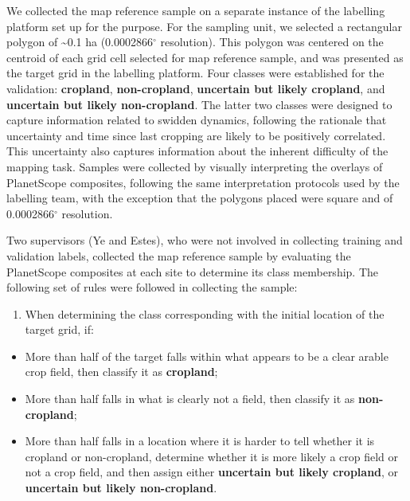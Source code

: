 \documentclass[
  11pt,
  a4paper]{article}
\providecommand{\tightlist}{%
  \setlength{\itemsep}{0pt}\setlength{\parskip}{0pt}}
\begin{document}
We collected the map reference sample on a separate instance of the
labelling platform set up for the purpose. For the sampling unit, we
selected a rectangular polygon of \textasciitilde0.1 ha
(0.0002866\(^\circ\) resolution). This polygon was centered on the
centroid of each grid cell selected for map reference sample, and was
presented as the target grid in the labelling platform. Four classes
were established for the validation: \textbf{cropland},
\textbf{non-cropland}, \textbf{uncertain but likely cropland}, and
\textbf{uncertain but likely non-cropland}. The latter two classes were
designed to capture information related to swidden dynamics, following
the rationale that uncertainty and time since last cropping are likely
to be positively correlated. This uncertainty also captures information
about the inherent difficulty of the mapping task. Samples were
collected by visually interpreting the overlays of PlanetScope
composites, following the same interpretation protocols used by the
labelling team, with the exception that the polygons placed were square
and of 0.0002866\(^\circ\) resolution.

Two supervisors (Ye and Estes), who were not involved in collecting
training and validation labels, collected the map reference sample by
evaluating the PlanetScope composites at each site to determine its
class membership. The following set of rules were followed in collecting
the sample:

\begin{enumerate}
\def\labelenumi{\arabic{enumi}.}
\tightlist
\item
  When determining the class corresponding with the initial location of
  the target grid, if:
\end{enumerate}

\begin{itemize}
\tightlist
\item
  More than half of the target falls within what appears to be a clear
  arable crop field, then classify it as \textbf{cropland};
\item
  More than half falls in what is clearly not a field, then classify it
  as \textbf{non-cropland};
\item
  More than half falls in a location where it is harder to tell whether
  it is cropland or non-cropland, determine whether it is more likely a
  crop field or not a crop field, and then assign either
  \textbf{uncertain but likely cropland}, or \textbf{uncertain but
  likely non-cropland}.
\end{itemize}
\end{document}
